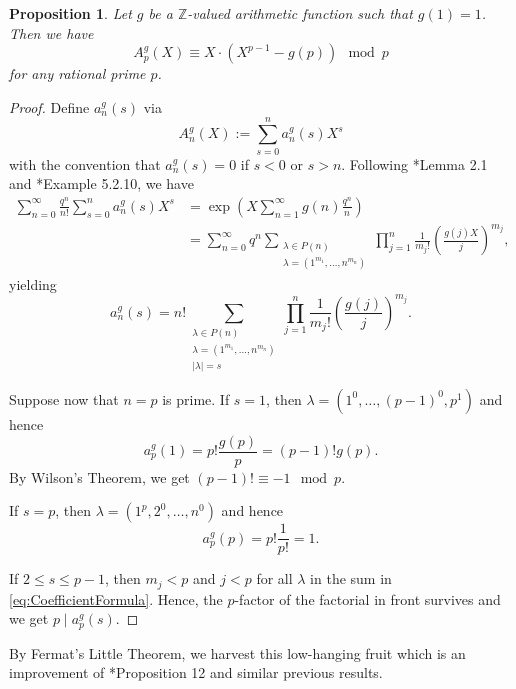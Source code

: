 \documentclass[a4paper, 11pt, reqno]{amsart}
\theoremstyle{plain}
\newtheorem{prop}[thm]{Proposition}
\theoremstyle{definition}
\theoremstyle{remark}
\numberwithin{equation}{section}
\newcommand{\Z}{\mathbb{Z}}
\begin{document}
\begin{prop}\label{prop:SplittingBehaviorOfA_p^g(X)ModP}
    Let $g$ be a $\Z$-valued arithmetic function such that $g(1) = 1$. Then we have
    \begin{equation*}\label{eq:SplittingBehaviorOfA_p^g(X)ModP}
        A_p^g(X) \equiv X \cdot \left(X^{p-1} - g(p)\right) \mod p
    \end{equation*}
    for any rational prime $p$.
\end{prop}

\begin{proof}
    Define $a_n^g(s)$ via
    \[A_n^g(X) := \sum_{s = 0}^n a_n^g(s)X^{s}\]
    with the convention that $a_n^g(s) = 0$ if $s < 0$ or $s > n$. Following \cite{AGOS}*{Lemma 2.1} and \cite{Stanley}*{Example 5.2.10}, we have
    \begin{align*}
        \sum_{n = 0}^\infty \frac{q^n}{n!} \sum_{s = 0}^n a_n^g(s) X^s &= \exp \left(X \sum_{n  = 1}^\infty g(n) \frac{q^n}{n}\right)\\
        &= \sum_{n = 0}^\infty q^n \sum_{\substack{\lambda \in P(n) \\ \lambda = (1^{m_1}, \ldots, n^{m_n})}} \prod_{j = 1}^n \frac{1}{m_j!} \left(\frac{g(j)X}{j}\right)^{m_j},
    \end{align*}
    yielding
    \begin{equation}\label{eq:CoefficientFormula}
        a_n^g(s) = n!\sum_{\substack{\lambda \in P(n) \\ \lambda = (1^{m_1}, \ldots, n^{m_n})\\
        |\lambda| = s}} \prod_{j = 1}^n \frac{1}{m_j!} \left(\frac{g(j)}{j}\right)^{m_j}.
    \end{equation}
    
    Suppose now that $n = p$ is prime. If $s = 1$, then $\lambda = (1^0, \ldots, (p-1)^0, p^1)$ and hence
    \[a_p^g(1) = p! \frac{g(p)}{p} = (p-1)!g(p).\]
    By Wilson's Theorem, we get $(p-1)! \equiv -1 \mod p$.

    If $s = p$, then $\lambda = (1^p, 2^0, \ldots, n^0)$ and hence
    \[a_p^g(p) = p! \frac{1}{p!} = 1.\]

    If $2 \leq s \leq p - 1$, then $m_j < p$ and $j < p$ for all $\lambda$ in the sum in \eqref{eq:CoefficientFormula}. Hence, the $p$-factor of the factorial in front survives and we get $p \mid a_p^g(s)$.
\end{proof}

By Fermat's Little Theorem, we harvest this low-hanging fruit which is an improvement of \cite{Zmija}*{Proposition 12} and similar previous results.
\end{document}
